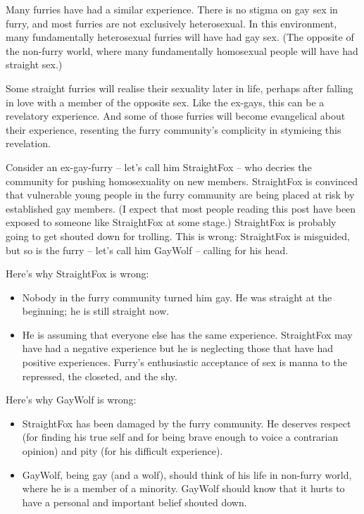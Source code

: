 Many furries have had a similar experience. There is no stigma on gay sex in furry, and most furries are not exclusively heterosexual. In this environment, many fundamentally heterosexual furries will have had gay sex. (The opposite of the non-furry world, where many fundamentally homosexual people will have had straight sex.)

Some straight furries will realise their sexuality later in life, perhaps after falling in love with a member of the opposite sex. Like the ex-gays, this can be a revelatory experience. And some of those furries will become evangelical about their experience, resenting the furry community's complicity in stymieing this revelation.

Consider an ex-gay-furry -- let's call him StraightFox -- who decries the community for pushing homosexuality on new members. StraightFox is convinced that vulnerable young people in the furry community are being placed at risk by established gay members. (I expect that most people reading this post have been exposed to someone like StraightFox at some stage.) StraightFox is probably going to get shouted down for trolling. This is wrong: StraightFox is misguided, but so is the furry -- let's call him GayWolf -- calling for his head.

Here's why StraightFox is wrong:

\begin{itemize}
  \item Nobody in the furry community turned him gay. He was straight at the beginning; he is still straight now.
  \item He is assuming that everyone else has the same experience. StraightFox may have had a negative experience but he is neglecting those that have had positive experiences. Furry's enthusiastic acceptance of sex is manna to the repressed, the closeted, and the shy.
\end{itemize}

Here's why GayWolf is wrong:

\begin{itemize}
  \item StraightFox has been damaged by the furry community. He deserves respect (for finding his true self and for being brave enough to voice a contrarian opinion) and pity (for his difficult experience).
  \item GayWolf, being gay (and a wolf), should think of his life in non-furry world, where he is a member of a minority. GayWolf should know that it hurts to have a personal and important belief shouted down.
\end{itemize}

